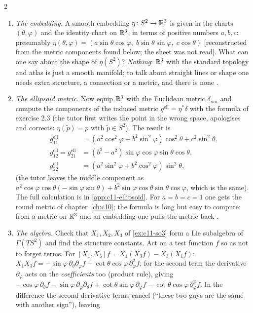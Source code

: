 \begin{paracol}{2}
\begin{enumerate}
  \item \emph{The embedding.} A smooth embedding $\eta\colon S^2\to\mathbb{R}^3$ is given in the charts $(\theta,\varphi)$ and the identity chart on $\mathbb{R}^3$, in terms of positive numbers $a,b,c$: presumably $\eta(\theta,\varphi)=(a\sin\theta\cos\varphi,\;b\sin\theta\sin\varphi,\;c\cos\theta)$ [reconstructed from the metric components found below; the sheet was not read]. What can one say about the shape of $\eta(S^2)$? \emph{Nothing}: $\mathbb{R}^3$ with the standard topology and atlas is just a smooth manifold; to talk about straight lines or shape one needs extra structure, a connection or a metric, and there is none .
  \item \emph{The ellipsoid metric.} Now equip $\mathbb{R}^3$ with the Euclidean metric $\delta_{mn}$ and compute the components of the induced metric $g^{\mathrm{ell}}=\eta^*\delta$ with the formula of exercise 2.3 (the tutor first writes the point in the wrong space, apologises and corrects: $\eta(\tilde p)=p$ with $\tilde p\in S^2$). The result is
        \begin{align*}
          g^{\mathrm{ell}}_{11}&=(a^2\cos^2\varphi+b^2\sin^2\varphi)\cos^2\theta+c^2\sin^2\theta,\\
          g^{\mathrm{ell}}_{12}=g^{\mathrm{ell}}_{21}&=(b^2-a^2)\sin\varphi\cos\varphi\sin\theta\cos\theta,\\
          g^{\mathrm{ell}}_{22}&=(a^2\sin^2\varphi+b^2\cos^2\varphi)\sin^2\theta,
        \end{align*}
        (the tutor leaves the middle component as $a^2\cos\varphi\cos\theta(-\sin\varphi\sin\theta)+b^2\sin\varphi\cos\theta\sin\theta\cos\varphi$, which is the same). The full calculation is in \cref{app:c11-ellipsoid}. For $a=b=c=1$ one gets the round metric of chapter~\ref{ch:c10}; the formula is long but easy to compute: from a metric on $\mathbb{R}^3$ and an embedding one pulls the metric back .
  \item \emph{The algebra.} Check that $X_1,X_2,X_3$ of \cref{ex:c11-so3} form a Lie subalgebra of $\Gamma(TS^2)$ and find the structure constants. Act on a test function $f$ so as not to forget terms. For $[X_1,X_3]f=X_1(X_3f)-X_3(X_1f)$: $X_1X_3f=-\sin\varphi\,\partial_\theta\partial_\varphi f-\cot\theta\cos\varphi\,\partial_\varphi^2f$; for the second term the derivative $\partial_\varphi$ acts on the \emph{coefficients} too (product rule), giving $-\cos\varphi\,\partial_\theta f-\sin\varphi\,\partial_\varphi\partial_\theta f+\cot\theta\sin\varphi\,\partial_\varphi f-\cot\theta\cos\varphi\,\partial_\varphi^2f$. In the difference the second-derivative terms cancel (``these two guys are the same with another sign''), leaving

\end{enumerate}
\end{paracol}
